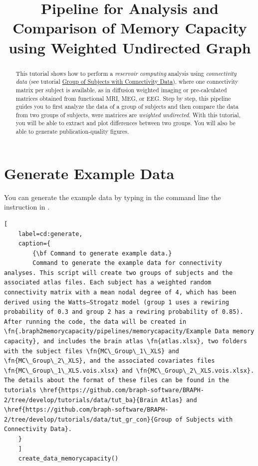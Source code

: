 \documentclass[justified]{tufte-handout}
\title[Analysis and Comparison of Memory Capacity WU]{Pipeline for Analysis and Comparison of Memory Capacity using Weighted Undirected Graph}
\begin{document}
\maketitle

\begin{abstract}
\noindent
This tutorial shows how to perform a \emph{reservoir computing} analysis using \emph{connectivity data} (see tutorial \href{https://github.com/braph-software/BRAPH-2/tree/develop/tutorials/data/tut_gr_con}{Group of Subjects with Connectivity Data}), where one connectivity matrix per subject is available, as in diffusion weighted imaging or pre-calculated matrices obtained from functional MRI, MEG, or EEG. Step by step, this pipeline guides you to first analyze the data of a group of subjects and then compare the data from two groups of subjects, were matrices are \emph{weighted undirected}.  With this tutorial, you will be able to extract and plot differences between two groups. You will also be able to generate publication-quality figures.
\end{abstract}

\tableofcontents

\clearpage

\section{Generate Example Data}

You can generate the example data by typing in the command line the instruction in .

\begin{lstlisting}[
	label=cd:generate,
	caption={
		{\bf Command to generate example data.}
		Command to generate the example data for connectivity analyses. This script will create two groups of subjects and the associated atlas files. Each subject has a weighted random connectivity matrix with a mean nodal degree of 4, which has been derived using the Watts–Strogatz model (group 1 uses a rewiring probability of 0.3 and group 2 has a rewiring probability of 0.85). After running the code, the data will be created in \fn{.braph2memorycapacity/pipelines/memorycapacity/Example Data memory capacity}, and includes the brain atlas \fn{atlas.xlsx}, two folders with the subject files \fn{MC\_Group\_1\_XLS} and \fn{MC\_Group\_2\_XLS}, and the associated covariates files \fn{MC\_Group\_1\_XLS.vois.xlsx} and \fn{MC\_Group\_2\_XLS.vois.xlsx}. The details about the format of these files can be found in the tutorials \href{https://github.com/braph-software/BRAPH-2/tree/develop/tutorials/data/tut_ba}{Brain Atlas} and \href{https://github.com/braph-software/BRAPH-2/tree/develop/tutorials/data/tut_gr_con}{Group of Subjects with Connectivity Data}.
	}
	]
	create_data_memorycapacity()
\end{lstlisting}
\end{document}
